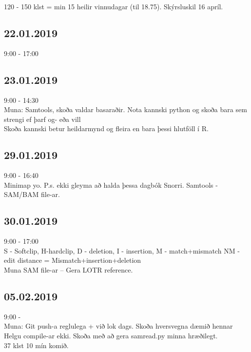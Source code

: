 \documentclass{article}
\begin{document}
120 - 150 klst = min 15 heilir vinnudagar (til 18.75). Skýrsluskil 16 apríl.

\subsection*{22.01.2019}
9:00 - 17:00

\subsection*{23.01.2019}
9:00 - 14:30 \\
Muna:
Samtools, skoða valdar basaraðir. Nota kannski python og skoða bara sem  strengi ef þarf og- eða vill \\
Skoða kannski betur heildarmynd og fleira en bara þessi hlutföll í R.

\subsection*{29.01.2019}
9:00 - 16:40 \\
Minimap yo. P.s. ekki gleyma að halda þessa dagbók Snorri. Samtools - SAM/BAM file-ar.

\subsection*{30.01.2019}
9:00 - 17:00 \\
S - Softclip, H-hardclip, D - deletion, I - insertion, M - match+mismatch
NM - edit distance = Mismatch+insertion+deletion \\
Muna SAM file-ar -- Gera LOTR reference.

\subsection*{05.02.2019}
9:00 - \\
Muna: Git push-a reglulega + við lok dags. Skoða hversvegna dæmið hennar Helgu compile-ar ekki. Skoða með að gera samread.py minna hræðilegt. \\
37 klst 10 mín komið.
\end{document}
